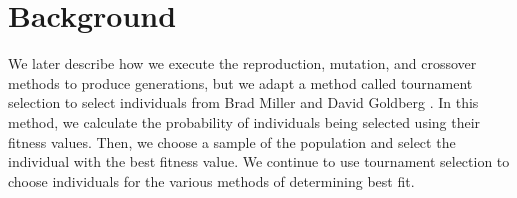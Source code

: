 
\section{Background}
\label{sec:background}



We later describe how we execute the reproduction, mutation, and crossover methods to produce generations, but we adapt a method called tournament selection to select individuals from Brad Miller and David Goldberg \cite{tournamentselection}. In this method, we calculate the probability of individuals being selected using their fitness values. Then, we choose a sample of the population and select the individual with the best fitness value. We continue to use tournament selection to choose individuals for the various methods of determining best fit.



